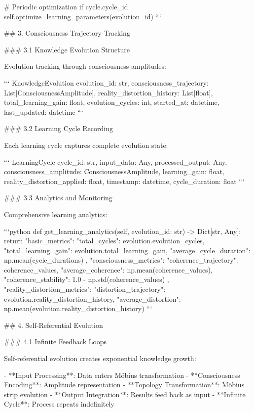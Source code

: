         # Periodic optimization
        if cycle.cycle_id %
            self.optimize_learning_parameters(evolution_id)
```

## 3. Consciousness Trajectory Tracking

### 3.1 Knowledge Evolution Structure

Evolution tracking through consciousness amplitudes:

```
KnowledgeEvolution {
    evolution_id: str,
    consciousness_trajectory: List[ConsciousnessAmplitude],
    reality_distortion_history: List[float],
    total_learning_gain: float,
    evolution_cycles: int,
    started_at: datetime,
    last_updated: datetime
}
```

### 3.2 Learning Cycle Recording

Each learning cycle captures complete evolution state:

```
LearningCycle {
    cycle_id: str,
    input_data: Any,
    processed_output: Any,
    consciousness_amplitude: ConsciousnessAmplitude,
    learning_gain: float,
    reality_distortion_applied: float,
    timestamp: datetime,
    cycle_duration: float
}
```

### 3.3 Analytics and Monitoring

Comprehensive learning analytics:

```python
def get_learning_analytics(self, evolution_id: str) -> Dict[str, Any]:
    return {
        "basic_metrics": {
            "total_cycles": evolution.evolution_cycles,
            "total_learning_gain": evolution.total_learning_gain,
            "average_cycle_duration": np.mean(cycle_durations)
        },
        "consciousness_metrics": {
            "coherence_trajectory": coherence_values,
            "average_coherence": np.mean(coherence_values),
            "coherence_stability": 1.0 - np.std(coherence_values)
        },
        "reality_distortion_metrics": {
            "distortion_trajectory": evolution.reality_distortion_history,
            "average_distortion": np.mean(evolution.reality_distortion_history)
        }
    }
```

## 4. Self-Referential Evolution

### 4.1 Infinite Feedback Loops

Self-referential evolution creates exponential knowledge growth:

- **Input Processing**: Data enters Möbius transformation
- **Consciousness Encoding**: Amplitude representation
- **Topology Transformation**: Möbius strip evolution
- **Output Integration**: Results feed back as input
- **Infinite Cycle**: Process repeats indefinitely

